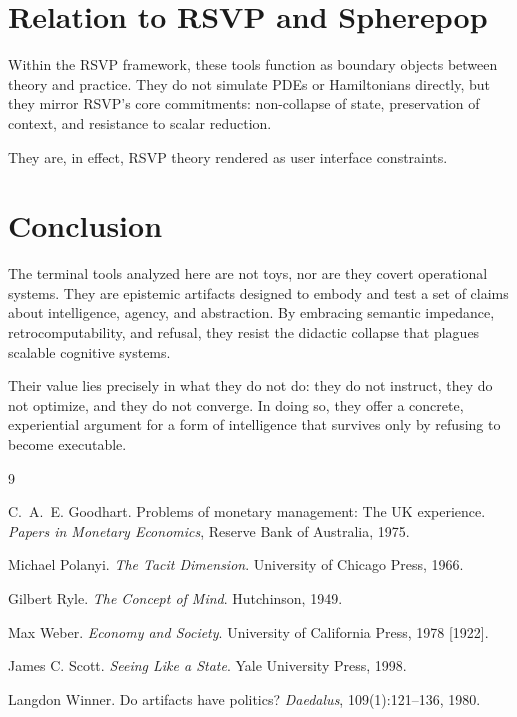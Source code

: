\documentclass[11pt]{article}
\begin{document}
\section{Relation to RSVP and Spherepop}

Within the RSVP framework, these tools function as boundary objects between
theory and practice. They do not simulate PDEs or Hamiltonians directly, but
they mirror RSVP’s core commitments: non-collapse of state, preservation of
context, and resistance to scalar reduction.

They are, in effect, RSVP theory rendered as user interface constraints.

\section{Conclusion}

The terminal tools analyzed here are not toys, nor are they covert operational
systems. They are epistemic artifacts designed to embody and test a set of
claims about intelligence, agency, and abstraction. By embracing semantic
impedance, retrocomputability, and refusal, they resist the didactic collapse
that plagues scalable cognitive systems.

Their value lies precisely in what they do not do: they do not instruct, they do
not optimize, and they do not converge. In doing so, they offer a concrete,
experiential argument for a form of intelligence that survives only by refusing
to become executable.

\begin{thebibliography}{9}

C.~A.~E. Goodhart.
\newblock Problems of monetary management: The UK experience.
\newblock \emph{Papers in Monetary Economics}, Reserve Bank of Australia, 1975.

Michael Polanyi.
\newblock \emph{The Tacit Dimension}.
\newblock University of Chicago Press, 1966.

Gilbert Ryle.
\newblock \emph{The Concept of Mind}.
\newblock Hutchinson, 1949.

Max Weber.
\newblock \emph{Economy and Society}.
\newblock University of California Press, 1978 [1922].

James C. Scott.
\newblock \emph{Seeing Like a State}.
\newblock Yale University Press, 1998.

Langdon Winner.
\newblock Do artifacts have politics?
\newblock \emph{Daedalus}, 109(1):121--136, 1980.

\end{thebibliography}
\end{document}
